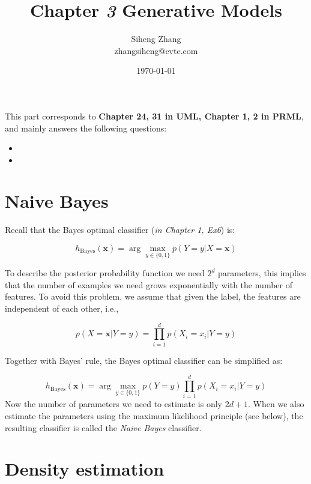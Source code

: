 \documentclass{article}
\author{Siheng Zhang\\zhangsiheng@cvte.com}
\title{Chapter \textbf{\textit{3}} Generative Models}
\date{\today}
\begin{document}
\maketitle  

This part corresponds to \textbf{Chapter 24, 31 in UML, Chapter 1, 2 in PRML}, and mainly answers the following questions:

\begin{itemize}
\item 
\item 
\end{itemize}

\tableofcontents
\newpage

\section{Naive Bayes}

	Recall that the Bayes optimal classifier (\textit{in Chapter 1, Ex6}) is:
	
	\begin{equation*}
	h_{\mathrm{Bayes}}(\bm{x}) = \arg\max\limits_{y\in\{0,1\}} p (Y=y|X=\bm{x})
	\end{equation*}
	
	To describe the posterior probability function we need $2^d$ parameters, this implies that the number of examples we need grows exponentially with the number of features. To avoid this problem, we assume that given the label, the features are independent of each other, i.e., 
	
	\begin{equation*}
	p (X=\bm{x}|Y=y) = \prod_{i=1}^d p (X_i=x_i|Y=y)
	\end{equation*}
	
	Together with Bayes' rule, the Bayes optimal classifier can be simplified as:
	
	\begin{equation}
	h_{\mathrm{Bayes}}(\bm{x}) = \arg\max\limits_{y\in\{0,1\}} p (Y=y) \prod_{i=1}^d p (X_i=x_i|Y=y)
	\end{equation}
Now the number of parameters we need to estimate is only $2d + 1$. When we also estimate the parameters using the maximum likelihood principle (see below), the resulting classifier is called the \textit{Naive Bayes} classifier.

\section{Density estimation}
\end{document}
